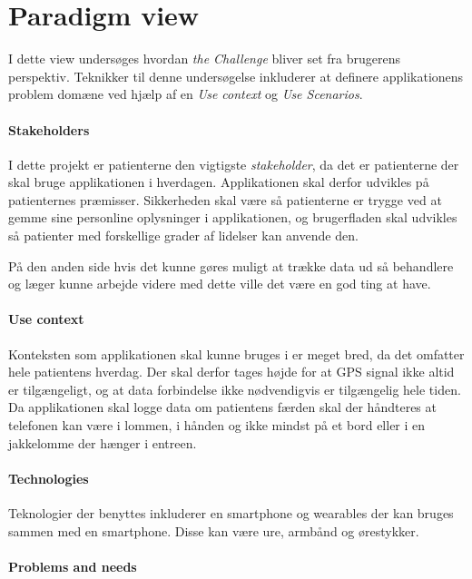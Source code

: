 

\section{Paradigm view}
I dette view undersøges hvordan \textit{the Challenge} bliver set fra brugerens perspektiv.
Teknikker til denne undersøgelse inkluderer at definere applikationens problem domæne ved hjælp af en \textit{Use context} og \textit{Use Scenarios}.

\paragraph{Stakeholders}
I dette projekt er patienterne den vigtigste \textit{stakeholder}, da det er patienterne der skal bruge applikationen i hverdagen.
Applikationen skal derfor udvikles på patienternes præmisser.
Sikkerheden skal være så patienterne er trygge ved at gemme sine personline oplysninger i applikationen, og brugerfladen skal udvikles så patienter med forskellige grader af lidelser kan anvende den.

På den anden side hvis det kunne gøres muligt at trække data ud så behandlere og læger kunne arbejde videre med dette ville det være en god ting at have.

\paragraph{Use context}
Konteksten som applikationen skal kunne bruges i er meget bred, da det omfatter hele patientens hverdag.
Der skal derfor tages højde for at GPS signal ikke altid er tilgængeligt, og at data forbindelse ikke nødvendigvis er tilgængelig hele tiden.
Da applikationen skal logge data om patientens færden skal der håndteres at telefonen kan være i lommen, i hånden og ikke mindst på et bord eller i en jakkelomme der hænger i entreen.

\paragraph{Technologies}
Teknologier der benyttes inkluderer en smartphone og wearables der kan bruges sammen med en smartphone.
Disse kan være ure, armbånd og ørestykker.

\paragraph{Problems and needs}

